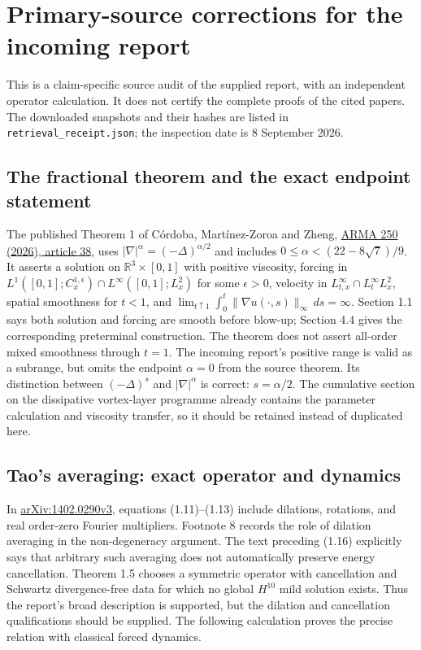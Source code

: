 \section{Primary-source corrections for the incoming report}
\label{sec:web-primary-corrections}

This is a claim-specific source audit of the supplied report, with an independent
operator calculation. It does not certify the complete proofs of the cited papers.
The downloaded snapshots and their hashes are listed in
\texttt{retrieval\_receipt.json}; the inspection date is 8 September 2026.

\subsection{The fractional theorem and the exact endpoint statement}
The published Theorem 1 of C\'ordoba, Mart\'inez-Zoroa and Zheng,
\href{https://doi.org/10.1007/s00205-026-02198-0}{ARMA 250 (2026), article 38},
uses $|\nabla|^\alpha=(-\Delta)^{\alpha/2}$ and includes
$0\leq\alpha<(22-8\sqrt7)/9$.
It asserts a solution on $\mathbb R^3\times[0,1]$ with positive viscosity,
forcing in $L^1([0,1];C^{1,\epsilon}_x)\cap L^\infty([0,1];L^2_x)$
for some $\epsilon>0$, velocity in $L^\infty_{t,x}\cap L^\infty_tL^2_x$,
spatial smoothness for $t<1$, and
$\lim_{t\uparrow1}\int_0^t\|\nabla u(\cdot,s)\|_\infty\,ds=\infty$.
Section 1.1 says both solution and forcing are smooth before blow-up;
Section 4.4 gives the corresponding preterminal construction.
The theorem does not assert all-order mixed smoothness through $t=1$.
The incoming report's positive range is valid as a subrange, but omits the
endpoint $\alpha=0$ from the source theorem. Its distinction between
$(-\Delta)^s$ and $|\nabla|^\alpha$ is correct: $s=\alpha/2$.
The cumulative section on the dissipative vortex-layer programme already
contains the parameter calculation and viscosity transfer, so it should be
retained instead of duplicated here.

\subsection{Tao's averaging: exact operator and dynamics}
In \href{https://arxiv.org/html/1402.0290v3}{arXiv:1402.0290v3},
equations (1.11)--(1.13) include dilations, rotations, and real order-zero
Fourier multipliers. Footnote 8 records the role of dilation averaging in the
non-degeneracy argument. The text preceding (1.16) explicitly says that
arbitrary such averaging does not automatically preserve energy cancellation.
Theorem 1.5 chooses a symmetric operator with cancellation and Schwartz
divergence-free data for which no global $H^{10}$ mild solution exists.
Thus the report's broad description is supported, but the dilation and
cancellation qualifications should be supplied. The following calculation
proves the precise relation with classical forced dynamics.

